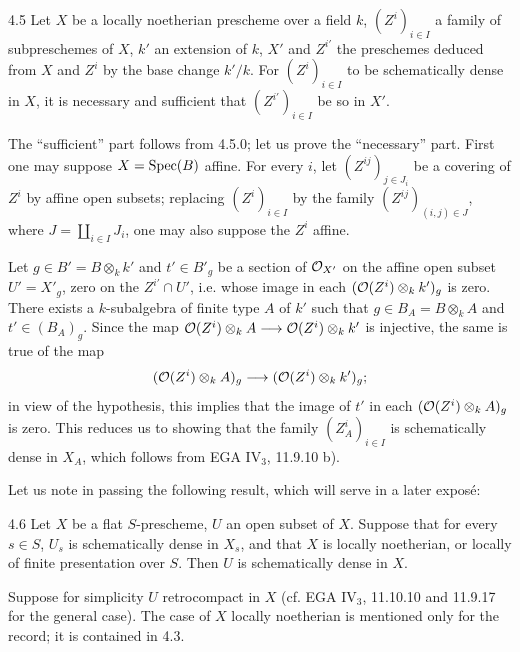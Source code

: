 \begin{lemma}{4.5}\label{IX.4.5}
Let $X$ be a locally noetherian prescheme over a field $k$, $(Z^i)_{i\in I}$ a family of subpreschemes of $X$, $k'$ an extension of $k$, $X'$ and $Z^{i'}$ the preschemes deduced from $X$ and $Z^i$ by the base change $k'/k$. For $(Z^i)_{i\in I}$ to be schematically dense in $X$, it is necessary and sufficient that $(Z^{i'})_{i\in I}$ be so in $X'$.
\end{lemma}
The ``sufficient'' part follows from 4.5.0; let us prove the ``necessary'' part. First one may suppose $X=\operatorname{Spec}(B)$ affine. For every $i$, let $(Z^{ij})_{j\in J_i}$ be a covering of $Z^i$ by affine open subsets; replacing $(Z^i)_{i\in I}$ by the family $(Z^{ij})_{(i,j)\in J}$, where $J=\coprod_{i\in I}J_i$, one may also suppose the $Z^i$ affine.

Let $g\in B'=B\otimes_k k'$ and $t'\in B'_g$ be a section of $\mathcal{O}_{X'}$ on the affine open subset $U'=X'_g$, zero on the $Z^{i'}\cap U'$, i.e. whose image in each $(\mathcal{O}(Z^i)\otimes_k k')_g$ is zero. There exists a $k$-subalgebra of finite type $A$ of $k'$ such that $g\in B_A=B\otimes_k A$ and $t'\in(B_A)_g$. Since the map $\mathcal{O}(Z^i)\otimes_k A\longrightarrow\mathcal{O}(Z^i)\otimes_k k'$ is injective, the same is true of the map
\[
(\mathcal{O}(Z^i)\otimes_k A)_g\longrightarrow(\mathcal{O}(Z^i)\otimes_k k')_g;
\]
in view of the hypothesis, this implies that the image of $t'$ in each $(\mathcal{O}(Z^i)\otimes_k A)_g$ is zero. This reduces us to showing that the family $(Z^i_A)_{i\in I}$ is schematically dense in $X_A$, which follows from EGA IV$_3$, 11.9.10 b).

Let us note in passing the following result, which will serve in a later expos\'e:
\begin{corollary}{4.6}\label{IX.4.6}
Let $X$ be a flat $S$-prescheme, $U$ an open subset of $X$. Suppose that for every $s\in S$, $U_s$ is schematically dense in $X_s$, and that $X$ is locally noetherian, or locally of finite presentation over $S$. Then $U$ is schematically dense in $X$.
\end{corollary}
Suppose for simplicity $U$ retrocompact in $X$ (cf. EGA IV$_3$, 11.10.10 and 11.9.17 for the general case). The case of $X$ locally noetherian is mentioned only for the record; it is contained in 4.3.

